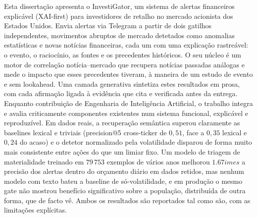 \begin{abstractotherlanguage}


Esta dissertação apresenta o InvestiGator, um sistema de alertas financeiros explicável (XAI-first)
para investidores de retalho no mercado acionista dos Estados Unidos. Envia alertas via Telegram a
partir de dois gatilhos independentes, movimentos abruptos de mercado detetados como anomalias
estatísticas e novas notícias financeiras, cada um com uma explicação rastreável: o evento, o
raciocínio, as fontes e os precedentes históricos. O seu núcleo é um motor de correlação
notícia--mercado que recupera notícias passadas análogas e mede o impacto que esses precedentes
tiveram, à maneira de um estudo de evento e sem lookahead. Uma camada generativa sintetiza estes
resultados em prosa, com cada afirmação ligada à evidência que cita e verificada antes da entrega.
Enquanto contribuição de Engenharia de Inteligência Artificial, o trabalho integra e avalia
criticamente componentes existentes num sistema funcional, explicável e reproduzível. Em dados
reais, a recuperação semântica superou claramente as baselines lexical e triviais (precision@5
cross-ticker de $0{,}51$, face a $0{,}35$ lexical e $0{,}24$ do acaso) e o detetor normalizado pela
volatilidade disparou de forma muito mais consistente entre ações do que um limiar fixo. Um modelo
de triagem de materialidade treinado em $79\,753$ exemplos de vários anos melhorou $1.67	imes$ a
precisão dos alertas dentro do orçamento diário em dados retidos, mas nenhum modelo com texto bateu
a baseline de só-volatilidade, e em produção o mesmo gate não mostrou benefício significativo sobre
a população, distribuída de outra forma, que de facto vê. Ambos os resultados são reportados tal
como são, com as limitações explícitas.

\end{abstractotherlanguage}


